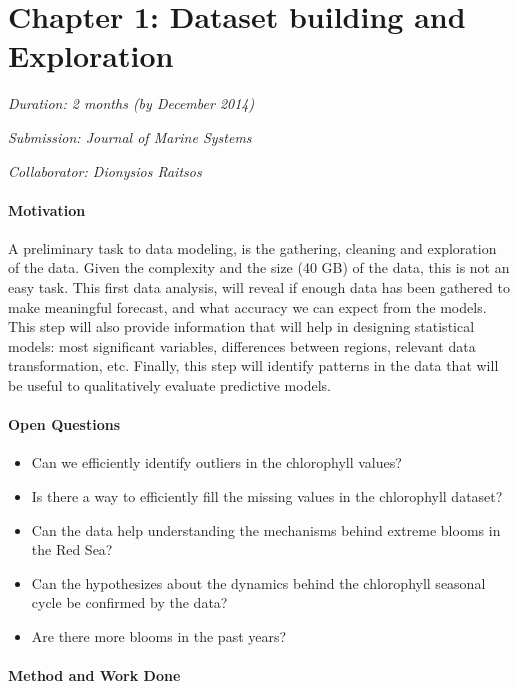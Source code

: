 \section{Chapter 1: Dataset building and Exploration}

\noindent
\emph{Duration: 2 months (by December 2014)}

\noindent
\emph{Submission: Journal of Marine Systems}

\noindent
\emph{Collaborator: Dionysios Raitsos}

\paragraph{Motivation}

A preliminary task to data modeling, is the gathering, cleaning and exploration of the data. Given the complexity and the size (40 GB) of the data, this is not an easy task. This first data analysis, will reveal if enough data has been gathered to make meaningful forecast, and what accuracy we can expect from the models. This step will also provide information that will help in designing statistical models: most significant variables, differences between regions, relevant data transformation, etc. Finally, this step will identify patterns in the data that will be useful to qualitatively evaluate predictive models.

\paragraph{Open Questions}

\begin{itemize}
\item Can we efficiently identify outliers in the chlorophyll values?
\item Is there a way to efficiently fill the missing values in the chlorophyll dataset?
\item Can the data help understanding the mechanisms behind extreme blooms in the Red Sea?
\item Can the hypothesizes about the dynamics behind the chlorophyll seasonal cycle be confirmed by the data?
\item Are there more blooms in the past years?
\end{itemize}

\paragraph{Method and Work Done}

